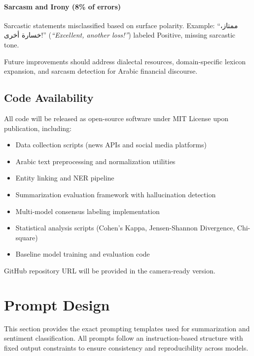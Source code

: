 \documentclass[10pt,a4paper]{article}
\begin{document}
\paragraph{Sarcasm and Irony (8\% of errors)} Sarcastic statements misclassified based on surface polarity. Example: 
\small
``\textarabic{ممتاز، خسارة أخرى!}'' (\textit{``Excellent, another loss!''}) labeled Positive, missing sarcastic tone.

Future improvements should address dialectal resources, domain-specific lexicon expansion, and sarcasm detection for Arabic financial discourse.

\subsection{Code Availability}

All code will be released as open-source software under MIT License upon publication, including:

\begin{itemize}
    \item Data collection scripts (news APIs and social media platforms)
    \item Arabic text preprocessing and normalization utilities
    \item Entity linking and NER pipeline
    \item Summarization evaluation framework with hallucination detection
    \item Multi-model consensus labeling implementation
    \item Statistical analysis scripts (Cohen's Kappa, Jensen-Shannon Divergence, Chi-square)
    \item Baseline model training and evaluation code
\end{itemize}

GitHub repository URL will be provided in the camera-ready version.

\section{Prompt Design}
\label{sec:prompt}

This section provides the exact prompting templates used for summarization and sentiment classification. All prompts follow an instruction-based structure with fixed output constraints to ensure consistency and reproducibility across models.
\end{document}
